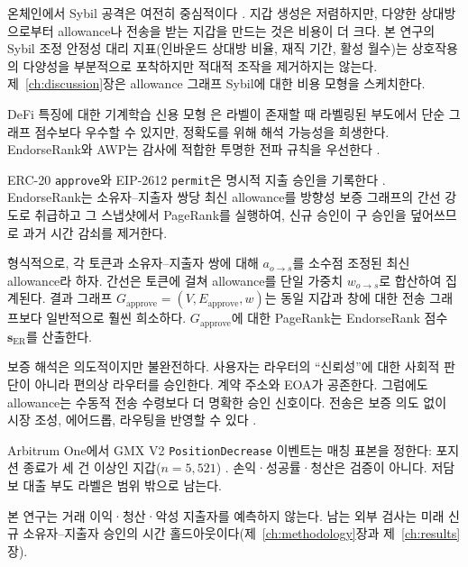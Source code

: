 온체인에서 Sybil 공격은 여전히 중심적이다 . 지갑 생성은 저렴하지만, 다양한 상대방으로부터 allowance나 전송을 받는 지갑을 만드는 것은 비용이 더 크다. 본 연구의 Sybil 조정 안정성 대리 지표(인바운드 상대방 비율, 재직 기간, 활성 월수)는 상호작용의 다양성을 부분적으로 포착하지만 적대적 조작을 제거하지는 않는다. 제~\ref{ch:discussion}장은 allowance 그래프 Sybil에 대한 비용 모형을 스케치한다.

DeFi 특징에 대한 기계학습 신용 모형 은 라벨이 존재할 때 라벨링된 부도에서 단순 그래프 점수보다 우수할 수 있지만, 정확도를 위해 해석 가능성을 희생한다. EndorseRank와 AWP는 감사에 적합한 투명한 전파 규칙을 우선한다 .


ERC-20 \texttt{approve}와 EIP-2612 \texttt{permit}은 명시적 지출 승인을 기록한다 . EndorseRank는 소유자--지출자 쌍당 최신 allowance를 방향성 보증 그래프의 간선 강도로 취급하고 그 스냅샷에서 PageRank를 실행하여, 신규 승인이 구 승인을 덮어쓰므로 과거 시간 감쇠를 제거한다.

형식적으로, 각 토큰과 소유자--지출자 쌍에 대해 $a_{o\to s}$를 소수점 조정된 최신 allowance라 하자. 간선은 토큰에 걸쳐 allowance를 단일 가중치 $w_{o\to s}$로 합산하여 집계된다. 결과 그래프 $G_{\text{approve}}=(V,E_{\text{approve}},w)$는 동일 지갑과 창에 대한 전송 그래프보다 일반적으로 훨씬 희소하다. $G_{\text{approve}}$에 대한 PageRank는 EndorseRank 점수 $\mathbf{s}_{\mathrm{ER}}$를 산출한다.

보증 해석은 의도적이지만 불완전하다. 사용자는 라우터의 ``신뢰성''에 대한 사회적 판단이 아니라 편의상 라우터를 승인한다. 계약 주소와 EOA가 공존한다. 그럼에도 allowance는 수동적 전송 수령보다 더 명확한 승인 신호이다. 전송은 보증 의도 없이 시장 조성, 에어드롭, 라우팅을 반영할 수 있다 .


Arbitrum One에서 GMX V2 \texttt{PositionDecrease} 이벤트는 매칭 표본을 정한다: 포지션 종료가 세 건 이상인 지갑($n=5{,}521$) . 손익·성공률·청산은 검증이 아니다. 저담보 대출 부도 라벨은 범위 밖으로 남는다.


본 연구는 거래 이익·청산·악성 지출자를 예측하지 않는다. 남는 외부 검사는 미래 신규 소유자--지출자 승인의 시간 홀드아웃이다(제~\ref{ch:methodology}장과 제~\ref{ch:results}장).

